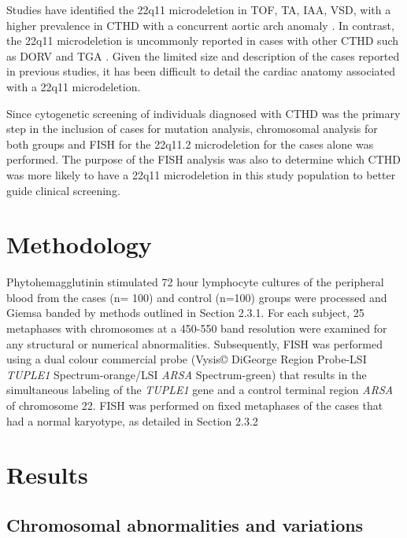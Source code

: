 \begin{refsection}
Studies have identified the 22q11 microdeletion in TOF, TA, IAA, VSD, with a higher prevalence in CTHD with a concurrent aortic arch anomaly \cite{volpe200322q11, momma2010cardiovascular, park2007cardiovascular, ziolkowska2008chromosome, mcdonald2008genetic, mcelhinney2003chromosome, mcelhinney2001association, goldmuntz1998frequency}. In contrast, the 22q11 microdeletion is uncommonly reported in cases with other CTHD such as DORV and TGA \cite{momma2010cardiovascular, goldmuntz1998frequency, van2011changing}. Given the limited size and description of the cases reported in previous studies, it has been difficult to detail the cardiac anatomy associated with a 22q11 microdeletion. 

Since cytogenetic screening of individuals diagnosed with CTHD was the primary step in the inclusion of cases for mutation analysis, chromosomal analysis for both groups and FISH for the 22q11.2 microdeletion for the cases alone was performed. The purpose of the FISH analysis was also to determine which CTHD was more likely to have a 22q11 microdeletion in this study population to better guide clinical screening.



\section{Methodology}
Phytohemagglutinin stimulated 72 hour lymphocyte cultures of the peripheral blood from the cases (n= 100) and control (n=100) groups were processed and Giemsa banded by methods outlined in Section 2.3.1. For each subject, 25 metaphases with chromosomes at a 450-550 band resolution were examined for any structural or numerical abnormalities. 
Subsequently, FISH was performed using a dual colour commercial probe (Vysis© DiGeorge Region Probe-LSI \textit{TUPLE1} Spectrum-orange/LSI \textit{ARSA} Spectrum-green) that results in the simultaneous labeling of the \textit{TUPLE1} gene and a control terminal region \textit{ARSA} of chromosome 22. FISH was performed on fixed metaphases of the cases that had a normal karyotype, as detailed in Section 2.3.2


\section{Results}

\subsection*{Chromosomal abnormalities and variations}



\end{refsection}

